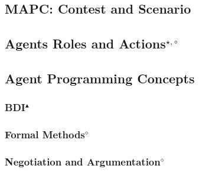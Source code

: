 \subsection{MAPC: Contest and Scenario}


\subsection[Agent Roles and Actions]{Agents Roles and Actions$^{\star,\circ}$}\label{fun:mapc_roles}


\subsection{Agent Programming Concepts}

\subsubsection[BDI]{BDI$^\blacktriangle$}\label{fun:BDI}


\subsubsection[Formal Methods]{Formal Methods$^\diamond$}


\subsubsection[Negotiation and Argumentation]{Negotiation and Argumentation$^\diamond$}



